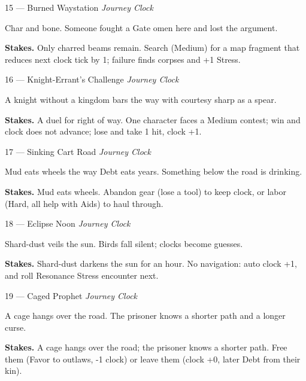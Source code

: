 \begin{encounterentry}{15 --- Burned Waystation}
\textit{Journey Clock}

Char and bone. Someone fought a Gate omen here and lost the argument.

\textbf{Stakes.} Only charred beams remain. Search (Medium) for a map fragment that reduces next clock tick by 1; failure finds corpses and +1 Stress.
\end{encounterentry}

\begin{encounterentry}{16 --- Knight-Errant's Challenge}
\textit{Journey Clock}

A knight without a kingdom bars the way with courtesy sharp as a spear.

\textbf{Stakes.} A duel for right of way. One character faces a Medium contest; win and clock does not advance; lose and take 1 hit, clock +1.
\end{encounterentry}

\begin{encounterentry}{17 --- Sinking Cart Road}
\textit{Journey Clock}

Mud eats wheels the way Debt eats years. Something below the road is drinking.

\textbf{Stakes.} Mud eats wheels. Abandon gear (lose a tool) to keep clock, or labor (Hard, all help with Aids) to haul through.
\end{encounterentry}

\begin{encounterentry}{18 --- Eclipse Noon}
\textit{Journey Clock}

Shard-dust veils the sun. Birds fall silent; clocks become guesses.

\textbf{Stakes.} Shard-dust darkens the sun for an hour. No navigation: auto clock +1, and roll Resonance Stress encounter next.
\end{encounterentry}

\begin{encounterentry}{19 --- Caged Prophet}
\textit{Journey Clock}

A cage hangs over the road. The prisoner knows a shorter path and a longer curse.

\textbf{Stakes.} A cage hangs over the road; the prisoner knows a shorter path. Free them (Favor to outlaws, -1 clock) or leave them (clock +0, later Debt from their kin).
\end{encounterentry}

